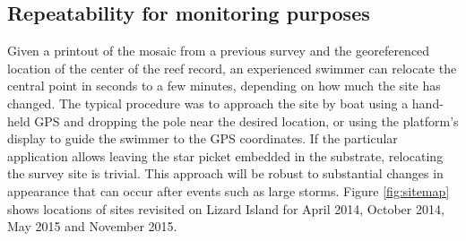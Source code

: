 
\subsection{Repeatability for monitoring purposes}
Given a printout of the mosaic from a previous survey and the georeferenced location of the center of the reef record, an experienced swimmer can relocate the central point in seconds to a few minutes, depending on how much the site has changed. The typical procedure was to approach the site by boat using a hand-held GPS and dropping the pole near the desired location, or using the platform's display to guide the swimmer to the GPS coordinates.
If the particular application allows leaving the star picket embedded in the substrate, relocating the survey site is trivial. This approach will be robust to substantial changes in appearance that can occur after events such as large storms.
Figure \ref{fig:sitemap} shows locations of sites revisited on Lizard Island for April 2014, October 2014, May 2015 and November 2015.
